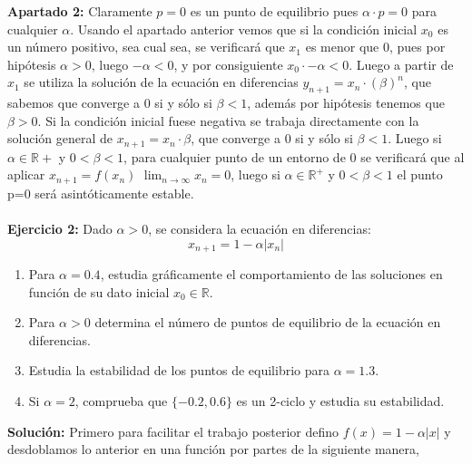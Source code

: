 \documentclass{article}
\begin{document}
\textbf{Apartado 2:} Claramente $p=0$ es un punto de equilibrio pues $\alpha \cdot p = 0$ para cualquier $\alpha$.
Usando el apartado anterior vemos que si la condición inicial $x_0$ es un número positivo, sea cual sea, se verificará que $x_1$ es menor que 0, pues por hipótesis $\alpha > 0$, luego $-\alpha < 0$, y por consiguiente $x_0 \cdot -\alpha < 0$. Luego a partir de $x_1$ se utiliza la solución de la ecuación en diferencias $y_{n+1}=x_n \cdot (\beta)^n$, que sabemos que converge a 0 si y sólo si $\beta < 1$, además por hipótesis tenemos que $\beta > 0$. Si la condición inicial fuese negativa se trabaja directamente con la solución general de $x_{n+1}=x_n \cdot \beta$, que converge a 0 si y sólo si $\beta < 1$. Luego si $\alpha \in \mathbb{R}+$ y $0 < \beta < 1$, para cualquier punto de un entorno de 0 se verificará que al aplicar $x_{n+1} = f(x_n)$ $\lim_{n \to \infty} x_n = 0$, luego si $\alpha \in \mathbb{R}^+$ y $0 < \beta < 1$ el punto p=0 será asintóticamente estable. \\ \\

\textbf{Ejercicio 2:} Dado $\alpha > 0$, se considera la ecuación en diferencias:
\begin{equation*}
x_{n+1} = 1 - \alpha|x_n|
\end{equation*}

\begin{enumerate}
\item Para $\alpha = 0.4$, estudia gráficamente el comportamiento de las soluciones en función de su dato inicial $x_0 \in \mathbb{R}$.
\item Para $\alpha > 0$ determina el número de puntos de equilibrio de la ecuación en diferencias.
\item Estudia la estabilidad de los puntos de equilibrio para $\alpha = 1.3$.
\item Si $\alpha = 2$, comprueba que $\{-0.2,0.6\}$ es un 2-ciclo y estudia su estabilidad.
\end{enumerate}

\textbf{Solución:} Primero para facilitar el trabajo posterior defino $f(x) = 1 - \alpha|x|$ y desdoblamos lo anterior en una función por partes de la siguiente manera,
\end{document}
